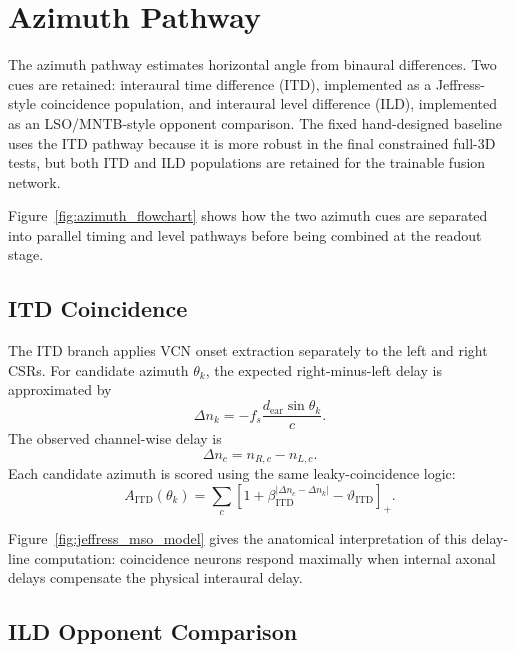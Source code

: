 \section{Azimuth Pathway}

The azimuth pathway estimates horizontal angle from binaural differences. Two cues are retained: interaural time difference (ITD), implemented as a Jeffress-style coincidence population, and interaural level difference (ILD), implemented as an LSO/MNTB-style opponent comparison. The fixed hand-designed baseline uses the ITD pathway because it is more robust in the final constrained full-3D tests, but both ITD and ILD populations are retained for the trainable fusion network.



Figure~\ref{fig:azimuth_flowchart} shows how the two azimuth cues are separated into parallel timing and level pathways before being combined at the readout stage.

\subsection{ITD Coincidence}

The ITD branch applies VCN onset extraction separately to the left and right CSRs. For candidate azimuth $\theta_k$, the expected right-minus-left delay is approximated by
\begin{equation}
    \Delta n_k
    =
    -f_s\frac{d_{\mathrm{ear}}\sin\theta_k}{c}.
\end{equation}
The observed channel-wise delay is
\begin{equation}
    \Delta n_c = n_{R,c}-n_{L,c}.
\end{equation}
Each candidate azimuth is scored using the same leaky-coincidence logic:
\begin{equation}
    A_{\mathrm{ITD}}(\theta_k)
    =
    \sum_c
    \left[
    1+\beta_{\mathrm{ITD}}^{|\Delta n_c-\Delta n_k|}
    -
    \vartheta_{\mathrm{ITD}}
    \right]_+.
\end{equation}



Figure~\ref{fig:jeffress_mso_model} gives the anatomical interpretation of this delay-line computation: coincidence neurons respond maximally when internal axonal delays compensate the physical interaural delay.

\subsection{ILD Opponent Comparison}

